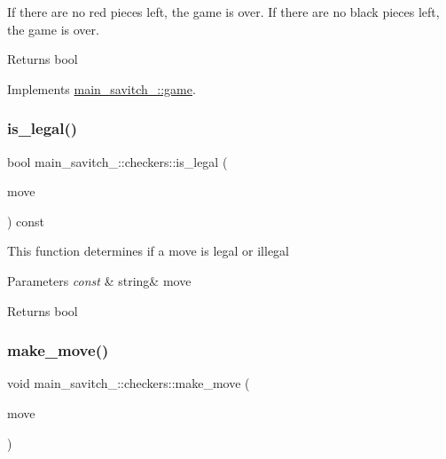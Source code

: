 If there are no red pieces left, the game is over. If there are no black pieces left, the game is over. \begin{DoxyReturn}{Returns}
bool 
\end{DoxyReturn}


Implements \hyperlink{classmain__savitch__14_1_1game}{main\+\_\+savitch\+\_\+::game}.

\mbox{\label{classmain__savitch__14_1_1checkers_afc7d56fe1f0637a02cad352e9cda9ee3}} 
\subsubsection{\texorpdfstring{is\+\_\+legal()}{is\_legal()}}
{\footnotesize\ttfamily bool main\+\_\+savitch\+\_\+::checkers\+::is\+\_\+legal (\begin{DoxyParamCaption}\item[{const string \&}]{move }\end{DoxyParamCaption}) const}

This function determines if a move is legal or illegal 
\begin{DoxyParams}{Parameters}
{\em const} & string\& move \\
\hline
\end{DoxyParams}
\begin{DoxyReturn}{Returns}
bool 
\end{DoxyReturn}
\mbox{\label{classmain__savitch__14_1_1checkers_a8a08c0555d5b8c264472cc94a2f007e3}} 
\subsubsection{\texorpdfstring{make\+\_\+move()}{make\_move()}}
{\footnotesize\ttfamily void main\+\_\+savitch\+\_\+::checkers\+::make\+\_\+move (\begin{DoxyParamCaption}\item[{const string \&}]{move }\end{DoxyParamCaption})}

